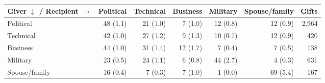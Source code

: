 \begin{tabular}{lrrrrrr}
\toprule
Giver $\downarrow$ / Recipient $\rightarrow$ & Political & Technical & Business & Military & Spouse/family & Gifts \\
\midrule
Political & 48 (1.1) & 21 (1.0) & 7 (1.0) & 12 (0.8) & 12 (0.9) & 2,964 \\
Technical & 42 (1.0) & 27 (1.2) & 9 (1.3) & 10 (0.7) & 12 (0.9) & 420 \\
Business & 44 (1.0) & 31 (1.4) & 12 (1.7) & 7 (0.4) & 7 (0.5) & 138 \\
Military & 23 (0.5) & 24 (1.1) & 6 (0.8) & 44 (2.7) & 4 (0.3) & 631 \\
Spouse/family & 16 (0.4) & 7 (0.3) & 7 (1.0) & 1 (0.0) & 69 (5.4) & 167 \\
\bottomrule
\end{tabular}
